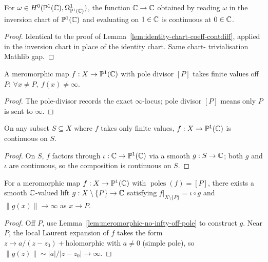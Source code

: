 \begin{lemma}
\label{lem:inversion-chart-coeff-continuous-at-zero}
For \(\omega\in H^{0}(\mathbb{P}^{1}(\mathbb{C}),\Omega^{1}_{\mathbb{P}^{1}(\mathbb{C})})\), the function
\(\mathbb{C}\to\mathbb{C}\) obtained by reading \(\omega\) in the inversion chart
of \(\mathbb{P}^{1}(\mathbb{C})\) and evaluating on \(1\in\mathbb{C}\) is continuous at
\(0\in\mathbb{C}\).
\leanok
\end{lemma}
\begin{proof}\leanok
Identical to the proof of
Lemma~\ref{lem:identity-chart-coeff-contdiff}, applied in the
inversion chart in place of the identity chart. Same chart-
trivialisation Mathlib gap.
\end{proof}

\begin{lemma}
\label{lem:meromorphic-no-infty-off-pole}

A meromorphic map \(f:X\to\mathbb{P}^{1}(\mathbb{C})\) with pole divisor \([P]\) takes
finite values off \(P\): \(\forall x\neq P,\ f(x)\neq\infty\).
\leanok
\end{lemma}
\begin{proof}\leanok
The pole-divisor records the exact \(\infty\)-locus; pole divisor
\([P]\) means only \(P\) is sent to \(\infty\).
\end{proof}

\begin{lemma}
\label{lem:meromorphic-continuous-on-finite-set}

On any subset \(S\subseteq X\) where \(f\) takes only finite values,
\(f:X\to\mathbb{P}^{1}(\mathbb{C})\) is continuous on \(S\).
\leanok
\end{lemma}
\begin{proof}\leanok
On \(S\), \(f\) factors through \(\iota:\mathbb{C}\to\mathbb{P}^{1}(\mathbb{C})\) via a smooth
\(g:S\to\mathbb{C}\); both \(g\) and \(\iota\) are continuous, so the
composition is continuous on \(S\).
\end{proof}

\begin{lemma}
\label{lem:simple-pole-modulus-diverges}

For a meromorphic map \(f:X\to\mathbb{P}^{1}(\mathbb{C})\) with \(\operatorname{poles}(f)=[P]\), there
exists a smooth \(\mathbb{C}\)-valued lift \(g:X\setminus\{P\}\to\mathbb{C}\)
satisfying \(f|_{X\setminus\{P\}}=\iota\circ g\) and
\(\|g(x)\|\to\infty\) as \(x\to P\).
\leanok
\end{lemma}
\begin{proof}\leanok
Off \(P\), use Lemma~\ref{lem:meromorphic-no-infty-off-pole} to
construct \(g\). Near \(P\), the local Laurent expansion of \(f\)
takes the form \(z\mapsto a/(z-z_{0})+\text{holomorphic}\) with
\(a\neq 0\) (simple pole), so \(\|g(z)\|\sim|a|/|z-z_{0}|\to\infty\).
\end{proof}

